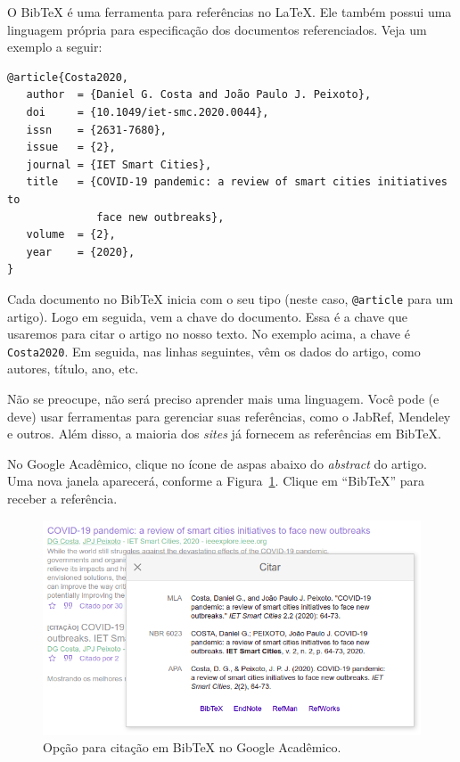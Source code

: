 O BibTeX é uma ferramenta para referências no \LaTeX. Ele também possui uma linguagem própria para especificação dos documentos referenciados. Veja um exemplo a seguir:

\begin{verbatim}
@article{Costa2020,
   author  = {Daniel G. Costa and João Paulo J. Peixoto},
   doi     = {10.1049/iet-smc.2020.0044},
   issn    = {2631-7680},
   issue   = {2},
   journal = {IET Smart Cities},
   title   = {COVID‐19 pandemic: a review of smart cities initiatives to
              face new outbreaks},
   volume  = {2},
   year    = {2020},
}
\end{verbatim}

Cada documento no BibTeX inicia com o seu tipo (neste caso, \verb=@article= para um artigo). Logo em seguida, vem a chave do documento. Essa é a chave que usaremos para citar o artigo no nosso texto. No exemplo acima, a chave é \verb=Costa2020=. Em seguida, nas linhas seguintes, vêm os dados do artigo, como autores, título, ano, etc.

Não se preocupe, não será preciso aprender mais uma linguagem. Você pode (e deve) usar ferramentas para gerenciar suas referências, como o JabRef, Mendeley e outros. Além disso, a maioria dos \emph{sites} já fornecem as referências em BibTeX.

No Google Acadêmico, clique no ícone de aspas abaixo do \emph{abstract} do artigo. Uma nova janela aparecerá, conforme a Figura~\ref{fig:bibtex_google}. Clique em ``BibTeX'' para receber a referência.

\begin{figure}[h]
    \centering
    \includegraphics[scale=0.5]{Figures/bibtex_google.png}
    \caption{Opção para citação em BibTeX no Google Acadêmico.}
    \label{fig:bibtex_google}
\end{figure}

